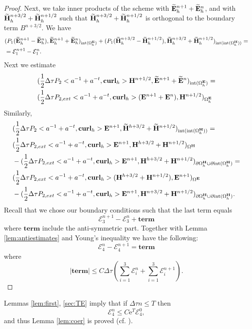 \documentclass[12pt,reqno]{amsart}
\newcommand{\curl}{{\bf curl}}
\newcommand{\e}{{\bf E}}
\newcommand{\h}{{\bf H}}
\theoremstyle{definition}
\numberwithin{equation}{section}
\newcommand{\intr}[1]{\mathrm{int}(#1)}
\def\Gw{\Omega}     \def\Gx{\Xi}         \def\Gy{\Psi}
\def\Gwh{\Omega_h}
\begin{document}
\begin{proof}
	
	Next, we take inner products of the scheme with $\widetilde{\e}_h^{n+1}+\widetilde{\e}_h^n$,
	and with 
	$\widetilde{\h}_h^{n+3/2}+\widetilde{\h}_h^{n+1/2}$ such that 
	$\widetilde{\h}_h^{n+3/2}+\widetilde{\h}_h^{n+1/2}$ is orthogonal to the boundary term $B^{n+3/2}$.
We have
	\begin{align*}
		&
		(P_1(\widetilde{\e}^{n+1}_h-\widetilde{\e}^{n}_h),\widetilde{\e}^{n+1}_h+\widetilde{\e}^{n}_h)_{\intr{\Gwh^\e}}+
		(P_1(\widetilde{\h}^{n+3/2}_h-\widetilde{\h}^{n+1/2}_h),\widetilde{\h}^{n+3/2}_h+\widetilde{\h}^{n+1/2}_h)_{\intr{\intr{\Gwh^\h}}}=\\&
		=\mathcal{E}_1^{n+1}-\mathcal{E}_1^{n}.
	\end{align*}
	Next we estimate
	\begin{align*}
		&
		(\frac{1}{2}\Delta \tau P_2<a^{-1}+a^{-t},\curl_h>\h^{n+1/2},\widetilde{\e}^{n+1}+\widetilde{\e}^{n})_{ \intr{\Gwh^\e}}=\\&
		(\frac{1}{2}\Delta \tau P_{2,ext}<a^{-1}+a^{-t},\curl_h>(\e^{n+1}+\e^{n}),\h^{n+1/2})_{ {\Gwh^\e}}
	\end{align*}
	Similarly,
	\begin{align*}
		&
		(\frac{1}{2}\Delta \tau P_2<a^{-1}+a^{-t},\curl_h>\e^{n+1},\widetilde{\h}^{h+3/2}+\widetilde{\h}^{n+1/2})_{\intr{\intr{\Gwh^\h}}}=\\&
		(\frac{1}{2}\Delta \tau P_{2,ext}<a^{-1}+a^{-t},\curl_h>\e^{n+1},\h^{h+3/2}+\h^{n+1/2})_{{\Gw^\h}}
		\\&
		-(\frac{1}{2}\Delta \tau P_{2,ext}<a^{-1}+a^{-t},\curl_h>\e^{n+1},\h^{h+3/2}+\h^{n+1/2})_{\partial{\Gwh^\h}\cup \partial \intr{\Gwh^\h}}=\\&
		(\frac{1}{2}\Delta \tau P_{2,ext}<a^{-1}+a^{-t},\curl_h>(\h^{h+3/2}+\h^{n+1/2}),\e^{n+1})_{{{\Gw^\e}}}
		\\&
		-(\frac{1}{2}\Delta \tau P_{2,ext}<a^{-1}+a^{-t},\curl_h>\e^{n+1},\h^{n+3/2}+\h^{n+1/2})_{\partial{\Gwh^\h}\cup \partial \intr{\Gwh^\h}}.
	\end{align*}
	Recall that we chose our boundary conditions such that 
	the last term equals $$\mathcal{E}_3^{n+1}-\mathcal{E}_3^{n}+
	\mathbf{term}$$ where $\mathbf{term}$ include the anti-symmetric part.
	Together with Lemma \ref{lem:antiestimates} and Young's inequality we have the following:
		$$\mathcal{E}_4^n-
	\mathcal{E}_4^{n+1}=
	\mathbf{term}
		$$
		where 
		$$
	|	\mathbf{term}|\leq C \Delta \tau( \sum_{i=1}^3\mathcal{E}_i^n+
		\sum_{i=1}^3\mathcal{E}_i^{n+1}).
		$$
\end{proof}
Lemmas \ref{lem:first}, \ref{sec:TE} imply that if $\Delta \tau n\leq T$
then 
$$
\mathcal{E}_4^{n}\leq C \mathrm{e}^{T}\mathcal{E}_4^{0},
$$
and thus Lemma \ref{lem:coer} is proved (cf. \cite[chapter 5]{GKO}).
\end{document}
